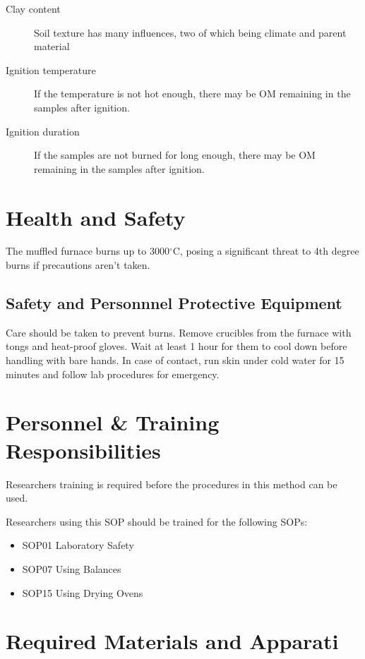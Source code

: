 \documentclass[12pt]{../SOP4_alpha}\usepackage[]{graphicx}\usepackage[]{xcolor}
\begin{document}
\begin{description}
  	\item[Clay content] Soil texture has many influences, two of which being climate and parent material 
		\item [Ignition temperature] If the temperature is not hot enough, there may be OM remaining in the samples after ignition.
		\item [Ignition duration] If the samples are not burned for long enough, there may be OM remaining in the samples after ignition.
\end{description}


\section{Health and Safety}

\NP The muffled furnace burns up to 3000$^\circ$C, posing a significant threat to 4th degree burns if precautions aren't taken.

\subsection*{Safety and Personnnel Protective Equipment}

\NP Care should be taken to prevent burns. Remove crucibles from the furnace with tongs and heat-proof gloves. Wait at least 1 hour for them to cool down before handling with bare hands. In case of contact, run skin under cold water for 15 minutes and follow lab procedures for emergency. 

\section{Personnel \& Training Responsibilities}

\NP Researchers training is required before the procedures in this method can be used.

\NP Researchers using this SOP should be trained for the following SOPs:

\begin{itemize}
  \item SOP01 Laboratory Safety
  \item SOP07 Using Balances
  \item SOP15 Using Drying Ovens
\end{itemize}

\newpage 

\section{Required Materials and Apparati}
\end{document}
